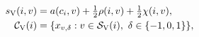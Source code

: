 \begin{equation}
 \begin{aligned}
 s_{\rm V}(i,v)&=a(c_i,v)+\tfrac12\rho(i,v)+\tfrac12\chi(i,v),\\
 \mathcal C_{\rm V}(i)&=\{x_{v,\delta}:v\in\mathcal S_{\rm V}(i),\ \delta\in\{-1,0,1\}\},
 \end{aligned}\label{eq:variable_selection}
\end{equation}
